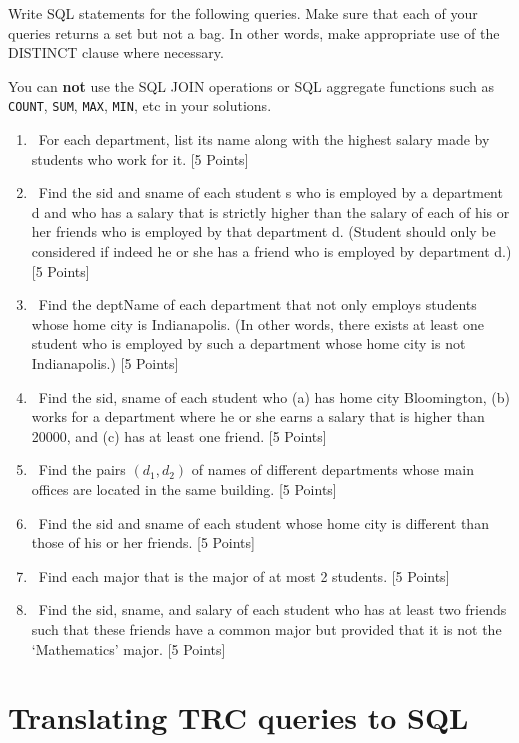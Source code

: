 \documentclass{article}
\begin{document}
Write SQL statements for the following queries. Make sure that each of your queries returns a set but not a bag. In other words, make appropriate use of the DISTINCT clause where necessary. 

You can {\bf not} use the SQL JOIN operations or SQL aggregate functions 
such as {\tt COUNT}, {\tt SUM}, {\tt MAX}, {\tt MIN}, etc in your solutions.
\begin{enumerate}[resume]

\item \ For each department, list its name along with the highest salary made by students who work for it.  [5 Points]


\item \ Find the sid and sname of each student s who is employed by a department d and who has a salary that is strictly higher than the salary of each of his or her friends who is employed by that department d. (Student should only be considered if indeed he or she has a friend who is employed by department d.) [5 Points]



\item \ Find the deptName of each department that not only employs students whose home city is Indianapolis. (In other words, there exists at least one student who is employed by such a department whose home city is not Indianapolis.) [5 Points]


\item  \ Find the sid, sname of each student who (a) has home city Bloomington, 
(b) works for a department where he or she earns a salary that is higher than 20000, and (c) has at least one friend.  [5 Points]
\item  \ Find the pairs $(d_1, d_2)$ of names of different departments whose main offices are located in the same building.  [5 Points]

\item  \ Find the sid and sname of each student whose home city is different than those of his or her friends.  [5 Points]
\item  \ Find each major that is the major of at most 2 students.  [5 Points]
\item  \ Find the sid, sname, and salary of each student who has at least two friends such that
these friends have a common major but provided that it is not the ‘Mathematics’ major.  [5 Points]

\end{enumerate}

\newpage
\section{Translating TRC queries to SQL }
\end{document}
